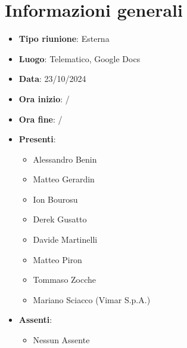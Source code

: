 \section{Informazioni generali}
\begin{itemize}
    \item \textbf{Tipo riunione}: Esterna
    \item \textbf{Luogo}: Telematico, Google Docs  \item \textbf{Data}: 23/10/2024
    \item \textbf{Ora inizio}: /
    \item \textbf{Ora fine}: /  
    \item \textbf{Presenti}:
    \begin{itemize}
        \item Alessandro Benin
        \item Matteo Gerardin
        \item Ion Bourosu
        \item Derek Gusatto
        \item Davide Martinelli
        \item Matteo Piron
        \item Tommaso Zocche
        \item Mariano Sciacco (Vimar S.p.A.)
  \end{itemize}

  \item \textbf{Assenti}:
  \begin{itemize}
        \item Nessun Assente
  \end{itemize}
 
\end{itemize}